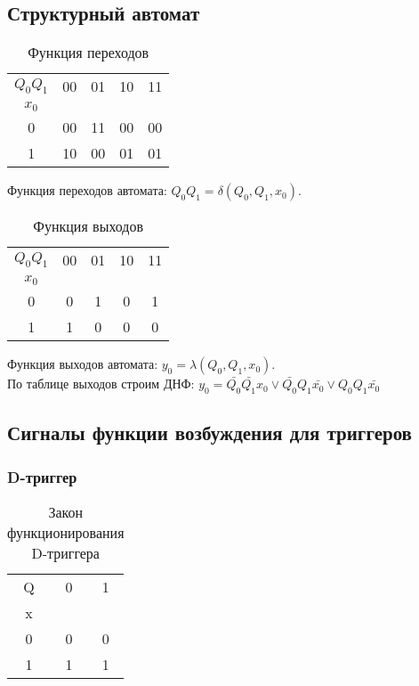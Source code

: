 \documentclass[a4paper,10pt]{article}
\begin{document}
	\subsection*{Структурный автомат}
		\begin{table}[h!]
		\center
		\begin{tabular}{|c|c|c|c|c|}
			\hline
    		 $Q_0Q_1$ & 00 & 01 & 10 & 11 \\ 
			 $x_0$    &    &	&	 &    \\ \hline
    			 0	  & 00 & 11 & 00 & 00 \\ \hline 
    			 1    & 10 & 00 & 01 & 01 \\ \hline
		\end{tabular}
		\caption{Функция переходов}
    \end{table}
	Функция переходов автомата: $Q_0Q_1 = \delta(Q_0,Q_1,x_0)$.

	\begin{table}[h!]
		\center
		\begin{tabular}{|c|c|c|c|c|}
			\hline
			  $Q_0Q_1$& 00 & 01 & 10 & 11 \\ 
			  $x_0$   &    &    &    &    \\ \hline
	      	     0    &  0 &  1 & 0  & 1  \\ \hline 
		         1    &  1 &  0 & 0  & 0  \\ \hline
		\end{tabular}
		\caption{Функция выходов}
    \end{table}	
	Функция выходов автомата: $y_0 = \lambda(Q_0,Q_1,x_0)$. \\

	По таблице выходов строим ДНФ:
	$y_0 = \bar{Q_0} \bar{Q_1} x_0 \lor \bar{Q_0} Q_1 \bar{x_0} \lor Q_0 Q_1 \bar{x_0}$

    \subsection*{Сигналы функции возбуждения для триггеров}
		\subsubsection*{D-триггер}
    		\begin{table}[h!]
				\center
    			\begin{tabular}{|c|c|c|}
					\hline
					 Q & 0 & 1 \\
					 x &   &   \\ \hline
					 0 & 0 & 0 \\ \hline
					 1 & 1 & 1 \\ \hline
				\end{tabular}
    			\caption{Закон функционирования D-триггера}
    		\end{table}
\end{document}
